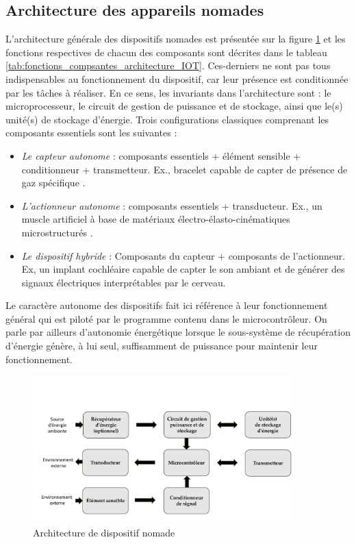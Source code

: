 	\subsection{Architecture des appareils nomades}
	\label{subsec:1.3.1_Architecture des appareils nomades}
L'architecture générale des dispositifs nomades est présentée sur la figure \ref{fig:noeud_capteur-actionneur} et les fonctions respectives de chacun des composants sont décrites dans le tableau \ref{tab:fonctions_compsantes_architecture_IOT}. Ces-derniers ne sont pas tous indispensables au fonctionnement du dispositif, car leur présence est conditionnée par les tâches à réaliser. En ce sens, les invariants dans l'architecture sont : le microprocesseur, le circuit de gestion de puissance et de stockage, ainsi que le(s) unité(s) de stockage d'énergie. Trois configurations classiques comprenant les composants essentiels sont les suivantes :
\begin{itemize}[label=$\circ$]
	\item \emph{Le capteur autonome} : composants essentiels + élément sensible + conditionneur + transmetteur. Ex., bracelet capable de capter de présence de gaz spécifique \cite{Choi2016}.
	\item \emph{L'actionneur autonome} : composants essentiels + transducteur. Ex., un muscle artificiel à base de matériaux électro-élasto-cinématiques microstructurés \cite{Lee2016}. 
	\item \emph{Le dispositif hybride} : Composants du capteur + composants de l'actionneur. Ex, un implant cochléaire capable de capter le son ambiant et de générer des signaux électriques interprétables par le cerveau. \cite{Yip2015}
\end{itemize}
Le caractère autonome des dispositifs fait ici référence à leur fonctionnement général qui est piloté par le programme contenu dans le microcontrôleur. On parle par ailleurs d'autonomie énergétique lorsque le sous-système de récupération d'énergie génère, à lui seul, suffisamment de puissance pour maintenir leur fonctionnement.
\begin{figure}[!htbp]
\centering
\captionsetup{justification=centering}
\includegraphics[trim={0.7cm 0cm 0cm 3.5cm},clip, width=0.9\textwidth]{../Chap1/Figure/noeud_capteur-actionneur.pdf}
\caption{Architecture de dispositif nomade \cite{Borole2021}}
\label{fig:noeud_capteur-actionneur}
\end{figure}
